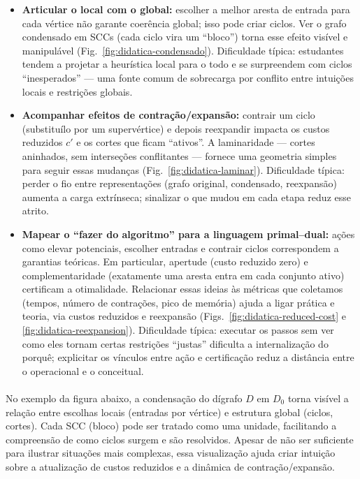 \documentclass[12pt,a4paper]{article}
\def\emph#1{#1}%
\begin{document}
\begin{itemize}\setlength{\itemsep}{2pt}
    \item \textbf{Articular o local com o global:} escolher a melhor aresta de entrada para cada vértice não garante coerência global; isso pode criar ciclos. Ver o grafo \emph{condensado} em SCCs (cada ciclo vira um ``bloco'') torna esse efeito visível e manipulável (Fig.~\ref{fig:didatica-condensado}). \emph{Dificuldade típica:} estudantes tendem a projetar a heurística local para o todo e se surpreendem com ciclos “inesperados” — uma fonte comum de sobrecarga por conflito entre intuições locais e restrições globais.
    \item \textbf{Acompanhar efeitos de contração/expansão:} contrair um ciclo (substituí\-lo por um supervértice) e depois reexpandir impacta os custos reduzidos \(c'\) e os cortes que ficam ``ativos''. A laminaridade — cortes aninhados, sem interseções conflitantes — fornece uma geometria simples para seguir essas mudanças (Fig.~\ref{fig:didatica-laminar}). \emph{Dificuldade típica:} perder o fio entre representações (grafo original, condensado, reexpansão) aumenta a carga extrínseca; sinalizar o que mudou em cada etapa reduz esse atrito.
    \item \textbf{Mapear o ``fazer do algoritmo'' para a linguagem primal–dual:} ações como elevar potenciais, escolher entradas e contrair ciclos correspondem a garantias teóricas. Em particular, \emph{apertude} (custo reduzido zero) e \emph{complementaridade} (exatamente uma aresta entra em cada conjunto ativo) certificam a otimalidade. Relacionar essas ideias às métricas que coletamos (tempos, número de contrações, pico de memória) ajuda a ligar prática e teoria, via custos reduzidos e reexpansão (Figs.~\ref{fig:didatica-reduced-cost} e \ref{fig:didatica-reexpansion}). \emph{Dificuldade típica:} executar os passos sem ver como eles tornam certas restrições “justas” dificulta a internalização do porquê; explicitar os vínculos entre ação e certificação reduz a distância entre o operacional e o conceitual.
\end{itemize}

\paragraph{}
No exemplo da figura abaixo, a condensação do dígrafo \(D\) em \(D_0\) torna visível a relação entre escolhas locais (entradas por vértice) e estrutura global (ciclos, cortes). Cada SCC (bloco) pode ser tratado como uma unidade, facilitando a compreensão de como ciclos surgem e são resolvidos. Apesar de não ser suficiente para ilustrar situações mais complexas, essa visualização ajuda criar intuição sobre a atualização de custos reduzidos e a dinâmica de contração/expansão.
\end{document}
